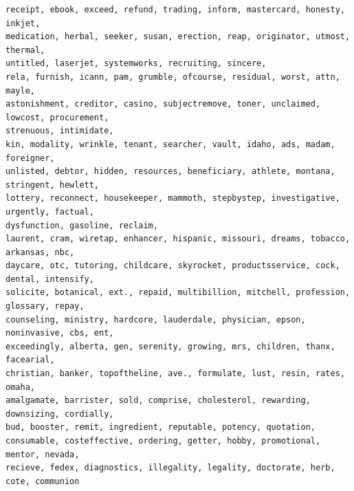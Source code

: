 \documentclass[a4paper,12pt]{article}
\begin{document}
\begin{verbatim}
receipt, ebook, exceed, refund, trading, inform, mastercard, honesty, inkjet,
medication, herbal, seeker, susan, erection, reap, originator, utmost, thermal, 
untitled, laserjet, systemworks, recruiting, sincere, 
rela, furnish, icann, pam, grumble, ofcourse, residual, worst, attn, mayle, 
astonishment, creditor, casino, subjectremove, toner, unclaimed, lowcost, procurement, 
strenuous, intimidate, 
kin, modality, wrinkle, tenant, searcher, vault, idaho, ads, madam, foreigner, 
unlisted, debtor, hidden, resources, beneficiary, athlete, montana, stringent, hewlett, 
lottery, reconnect, housekeeper, mammoth, stepbystep, investigative, urgently, factual, 
dysfunction, gasoline, reclaim, 
laurent, cram, wiretap, enhancer, hispanic, missouri, dreams, tobacco, arkansas, nbc, 
daycare, otc, tutoring, childcare, skyrocket, productsservice, cock, dental, intensify, 
solicite, botanical, ext., repaid, multibillion, mitchell, profession, glossary, repay, 
counseling, ministry, hardcore, lauderdale, physician, epson, noninvasive, cbs, ent, 
exceedingly, alberta, gen, serenity, growing, mrs, children, thanx, facearial, 
christian, banker, topoftheline, ave., formulate, lust, resin, rates, omaha, 
amalgamate, barrister, sold, comprise, cholesterol, rewarding, downsizing, cordially, 
bud, booster, remit, ingredient, reputable, potency, quotation, 
consumable, costeffective, ordering, getter, hobby, promotional, mentor, nevada, 
recieve, fedex, diagnostics, illegality, legality, doctorate, herb, cote, communion
	\end{verbatim}


\newpage
\end{document}
